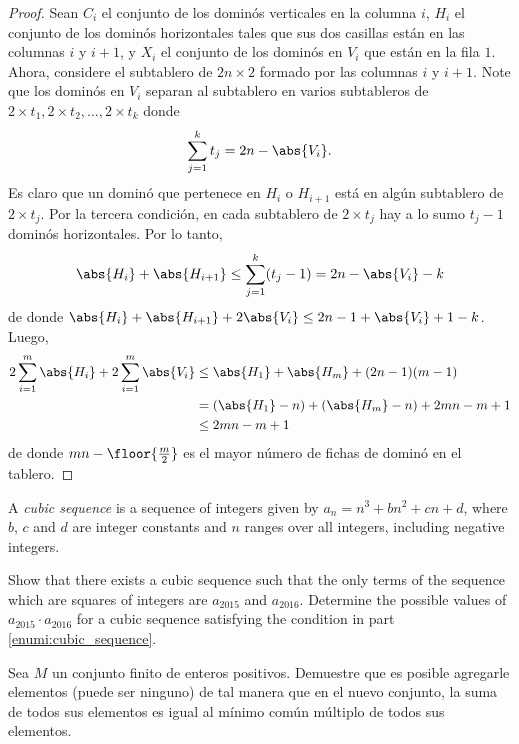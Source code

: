 \begin{proof}
	Sean $C_i$ el conjunto de los dominós verticales en la columna $i$, $H_i$ el conjunto de los dominós horizontales tales que sus dos casillas están en las columnas $i$ y $i+1$, y $X_i$ el conjunto de los dominós en $V_i$ que están en la fila $1$. Ahora, considere el subtablero de $2n\times 2$ formado por las columnas $i$ y $i+1$. Note que los dominós en $V_i$ separan al subtablero en varios subtableros de $2\times t_1,2\times t_2,\dots,2\times t_k$ donde
	\[\sum_{j=1}^k t_j=2n-\abs{V_i}.\]
	Es claro que un dominó que pertenece en $H_i$ o $H_{i+1}$ está en algún subtablero de $2\times t_j$. Por la tercera condición, en cada subtablero de $2\times t_j$ hay a lo sumo $t_j-1$ dominós horizontales. Por lo tanto,
	\[\abs{H_i}+\abs{H_{i+1}}\le\sum_{j=1}^k(t_j-1)=2n-\abs{V_i}-k\]
	de donde $\abs{H_i}+\abs{H_{i+1}}+2\abs{V_i}\le 2n-1+\abs{V_i}+1-k$. Luego,
	\begin{align*}
		2\sum_{i=1}^m\abs{H_i}+2\sum_{i=1}^m\abs{V_i}
		&\le\abs{H_1}+\abs{H_m}+(2n-1)(m-1) \\
		&=(\abs{H_1}-n)+(\abs{H_m}-n)+2mn-m+1 \\
		&\le 2mn-m+1
	\end{align*}
	de donde $mn-\floor{\frac{m}{2}}$ es el mayor número de fichas de dominó en el tablero.
\end{proof}

\begin{problem}[RMM 2016/3]
	A \emph{cubic sequence} is a sequence of integers given by $a_n=n^3+bn^2+cn+d$, where $b$, $c$ and $d$ are integer constants and $n$ ranges over all integers, including negative integers.
	\begin{enumerate}[(a)]
		\ii \label{enumi:cubic_sequence} Show that there exists a cubic sequence such that the only terms of the sequence which are squares of integers are $a_{2015}$ and $a_{2016}$.
		\ii Determine the possible values of $a_{2015}\cdot a_{2016}$ for a cubic sequence satisfying the condition in part \ref{enumi:cubic_sequence}.
	\end{enumerate}
\end{problem}

\begin{probMG}
	Sea $M$ un conjunto finito de enteros positivos. Demuestre que es posible agregarle elementos (puede ser ninguno) de tal manera que en el nuevo conjunto, la suma de todos sus elementos es igual al mínimo común múltiplo de todos sus elementos.
\end{probMG}

